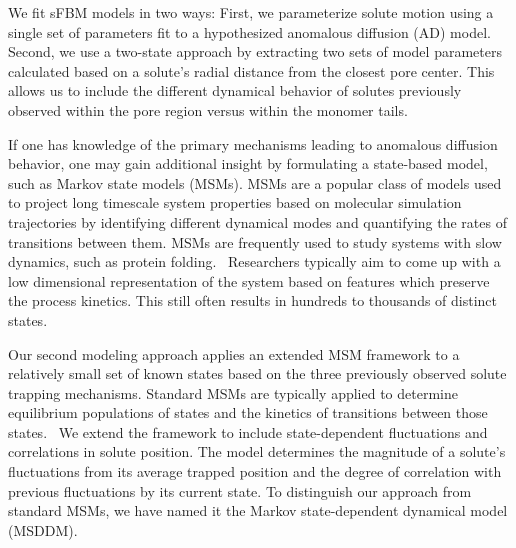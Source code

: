 \documentclass[journal=jctcce,manuscript=article]{achemso}
\begin{document}
  We fit sFBM models in two ways: First, we parameterize solute motion using
  a single set of parameters fit to a hypothesized anomalous diffusion (AD) model.
  Second, we use a two-state approach by extracting two sets of model parameters
  calculated based on a solute's radial distance from the closest pore center. 
  This allows us to include the different dynamical behavior of solutes previously
  observed within the pore region versus within the monomer tails.
 
  
  If one has knowledge of the primary mechanisms leading to anomalous diffusion
  behavior, one may gain additional insight by formulating a state-based model,
  such as Markov state models (MSMs). MSMs are a popular class of models used
  to project long timescale system properties based on molecular simulation
  trajectories by identifying different dynamical modes and quantifying the
  rates of transitions between them. MSMs are frequently used to study systems
  with slow dynamics, such as protein
  folding.~\cite{snow_how_2005,chodera_automatic_2007} Researchers typically
  aim to come up with a low dimensional representation of the system based on
  features which preserve the process kinetics. This still often results in
  hundreds to thousands of distinct states.~\cite{chodera_markov_2014}

  Our second modeling approach applies an extended MSM framework to a
  relatively small set of known states based on the three previously observed
  solute trapping mechanisms. Standard MSMs are typically applied to determine
  equilibrium populations of states and the kinetics of transitions between
  those states.~\cite{bowman_using_2009} We extend the framework to include
  state-dependent fluctuations and correlations in solute position. The model
  determines the magnitude of a solute's fluctuations from its average trapped
  position and the degree of correlation with previous fluctuations by its current
  state. To distinguish our approach from standard MSMs, we have named it the
  Markov state-dependent dynamical model (MSDDM).
  
\end{document}

